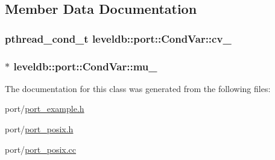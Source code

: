 \subsection{Member Data Documentation}
\hypertarget{classleveldb_1_1port_1_1_cond_var_a371cf7e27428abc9552a569e027589b0}{
\subsubsection[{cv\-\_\-}]{\setlength{\rightskip}{0pt plus 5cm}pthread\-\_\-cond\-\_\-t leveldb\-::port\-::\-Cond\-Var\-::cv\-\_\-\hspace{0.3cm}{\ttfamily [private]}}}\label{classleveldb_1_1port_1_1_cond_var_a371cf7e27428abc9552a569e027589b0}
\hypertarget{classleveldb_1_1port_1_1_cond_var_a55f10ea05ab190e8790979cd8583430b}{
\subsubsection[{mu\-\_\-}]{$\ast$ leveldb\-::port\-::\-Cond\-Var\-::mu\-\_\-\hspace{0.3cm}{\ttfamily [private]}}}\label{classleveldb_1_1port_1_1_cond_var_a55f10ea05ab190e8790979cd8583430b}


The documentation for this class was generated from the following files\-:\begin{DoxyCompactItemize}
\item 
port/\hyperlink{port__example_8h}{port\-\_\-example.\-h}\item 
port/\hyperlink{port__posix_8h}{port\-\_\-posix.\-h}\item 
port/\hyperlink{port__posix_8cc}{port\-\_\-posix.\-cc}\end{DoxyCompactItemize}
